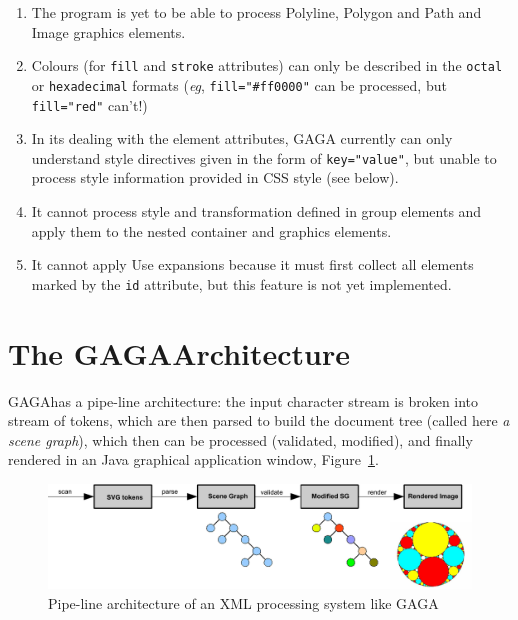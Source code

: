 \documentclass[a4paper]{article}
\newcommand{\forge}{\textsf{GAGA\space}}
\begin{document}
\begin{enumerate}
        \item The program is yet to be able to process \textsf{Polyline}, \textsf{Polygon} and 
        \textsf{Path} and \textsf{Image} graphics elements.
        \item Colours (for \verb!fill! and \verb!stroke! attributes) can only be described
        in the \verb!octal! or \verb!hexadecimal! formats (\emph{eg}, \verb!fill="#ff0000"! 
        can be processed, but \verb!fill="red"! can't!) 
        \item In its dealing with the element attributes, \forge 
        currently can only understand style directives given in the form of \verb!key="value"!,
        but unable to process style information provided in CSS style (see below).
        \item It cannot process style and transformation defined in group elements and apply them
        to the nested container and graphics elements.
        \item It cannot apply \textsf{Use} expansions because it must first collect all
        elements marked by the \verb!id! attribute, but this feature is not yet implemented.
\end{enumerate}

\vfill

\pagebreak

\section*{The \forge Architecture} %
\label{sec:the_forge_architecture}

\enlargethispage{1cm}
\forge has a pipe-line architecture: the input character stream is broken into stream of tokens, 
which are then parsed to build the document tree (called here \emph{a scene graph}), which then
can be processed (validated, modified), and finally rendered in an Java graphical application 
window, Figure~\ref{fig:pipeline}.

\begin{center}
\begin{figure}[ht]
\includegraphics[width=1.0\textwidth]{forge-pipe.pdf} 
\caption{Pipe-line architecture of an XML processing system like \forge}
\label{fig:pipeline}
\end{figure}
\end{center}
\end{document}
